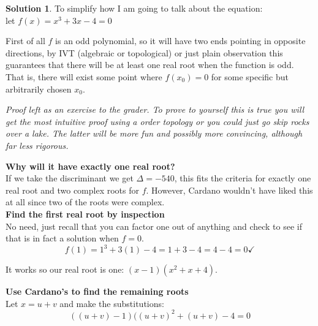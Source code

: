 \documentclass[10pt]{article}
\theoremstyle{plain}
\theoremstyle{definition}
\newtheorem*{sol}{Solution}
\theoremstyle{remark}
\begin{document}
\begin{sol}
To simplify how I am going to talk about the equation: \\
let $f(x) = x^3 + 3x - 4 = 0$ \\
\smallskip

First of all $f$ is an odd polynomial, so it will have two ends pointing in opposite directions, by IVT (algebraic or topological) or just plain observation this guarantees that there will be at least one real root when the function is odd. That is, there will exist some point where $f(x_0) = 0$ for some specific but arbitrarily chosen $x_0$. 

\medskip

\textit{Proof left as an exercise to the grader. To prove to yourself this is true you will get the most intuitive proof using a order topology or you could just go skip rocks over a lake. The latter will be more fun and possibly more convincing, although far less rigorous.}

\medskip 

\textbf{Why will it have exactly one real root?} \\
If we take the discriminant we get $\Delta = -540$, this fits the criteria for exactly one real root and two complex roots for $f$. 
However, Cardano wouldn't have liked this at all since two of the roots were complex. \\

\textbf{Find the first real root by inspection} \\
No need, just recall that you can factor one out of anything and check to see if that is in fact a solution when $f = 0$. 
\[ f(1) = 1^3 +3(1) - 4 = 1+ 3 -4 = 4 - 4 = 0 \checkmark \]

It works so our real root is one: $(x - 1)(x^2 +x +4)$. 

\textbf{Use Cardano's to find the remaining roots} \\

Let $x = u + v$ and make the substitutions: 
\[( (u+v)-1)((u+v)^2 + (u + v) -4 = 0\]

\end{sol}

\pagebreak
\end{document}
